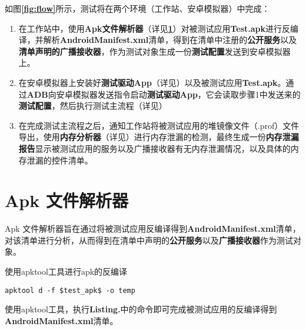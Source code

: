 如图\textbf{\textcolor{red}{\ref{fig:flow}}}所示，测试将在两个环境（工作站、安卓模拟器）中完成：
\begin{enumerate}
	\item 在工作站中，使用\textbf{Apk文件解析器}（详见\textbf{\textcolor{red}{\ref{apk analyser}}}）对被测试应用\textbf{Test.apk}进行反编译，并解析\textbf{AndroidManifest.xml}清单，得到在清单中注册的\textbf{公开服务}以及\textbf{清单声明的广播接收器}，作为测试对象生成一份\textbf{测试配置}发送到安卓模拟器上。
	\item 在安卓模拟器上安装好\textbf{测试驱动App}（详见\redbf{\ref{test driver app}}）以及被测试应用\textbf{Test.apk}。通过\textbf{ADB}向安卓模拟器发送指令启动\textbf{测试驱动App}，它会读取步骤1中发送来的\textbf{测试配置}，然后执行测试主流程（详见\redbf{\ref{main flow}}）
	\item 在完成测试主流程之后，通知工作站将被测试应用的堆镜像文件（.prof）文件导出，使用\textbf{内存分析器}（详见\redbf{\ref{memory analyser}}）进行内存泄漏的检测，最终生成一份\textbf{内存泄漏报告}显示被测试应用的服务以及广播接收器有无内存泄漏情况，以及具体的内存泄漏的控件清单。
\end{enumerate}

\section{Apk 文件解析器}\label{apk analyser}
Apk 文件解析器旨在通过将被测试应用反编译得到\textbf{AndroidManifest.xml}清单，对该清单进行分析，从而得到在清单中声明的\textbf{公开服务}以及\textbf{广播接收器}作为测试对象。
\begin{listing}[htbp]
	\centering
	\caption{使用apktool工具进行apk的反编译}
	\begin{verbatim}
apktool d -f $test_apk$ -o temp
	\end{verbatim}
	\label{shell:apktool}
\end{listing}

使用apktool工具\cite{apktool}，执行\textbf{Listing.}\redbf{\ref{shell:apktool}}中的命令即可完成被测试应用的反编译得到\textbf{AndroidManifest.xml}清单。


